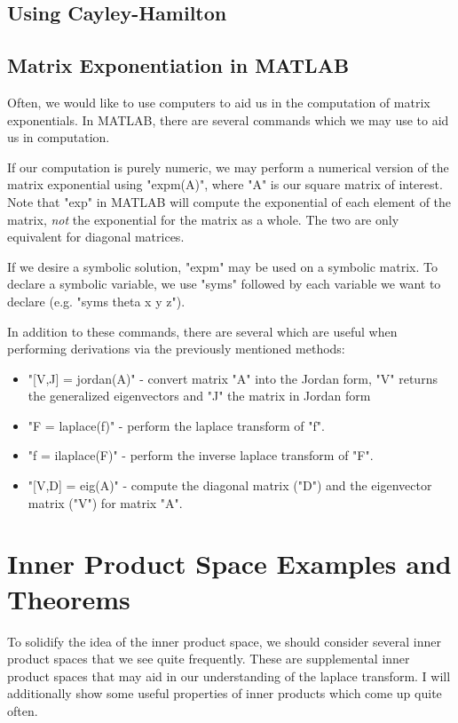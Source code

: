 \section{Using Cayley-Hamilton}


\section{Matrix Exponentiation in MATLAB}
Often, we would like to use computers to aid us in the computation of matrix exponentials. In MATLAB, there are several commands which we may use to aid us in computation.

If our computation is purely numeric, we may perform a numerical version of the matrix exponential using "expm(A)", where "A" is our square matrix of interest. Note that "exp" in MATLAB will compute the exponential of each element of the matrix, \textit{not} the exponential for the matrix as a whole. The two are only equivalent for diagonal matrices.

If we desire a symbolic solution, "expm" may be used on a symbolic matrix. To declare a symbolic variable, we use "syms" followed by each variable we want to declare (e.g. "syms theta x y z").

In addition to these commands, there are several which are useful when performing derivations via the previously mentioned methods:
\begin{itemize}
    \item "[V,J] = jordan(A)" - convert matrix "A" into the Jordan form, "V" returns the generalized eigenvectors and "J" the matrix in Jordan form
    \item "F = laplace(f)" - perform the \gls{laplace transform} of "f".
    \item "f = ilaplace(F)" - perform the inverse \gls{laplace transform} of "F".
    \item "[V,D] = eig(A)" - compute the diagonal matrix ("D") and the eigenvector matrix ("V") for matrix "A". 
\end{itemize}

\chapter{Inner Product Space Examples and Theorems}\label{sec:inner prod ex}
To solidify the idea of the inner product space, we should consider several inner product spaces that we see quite frequently. These are supplemental inner product spaces that may aid in our understanding of the \gls{laplace transform}. I will additionally show some useful properties of inner products which come up quite often.

